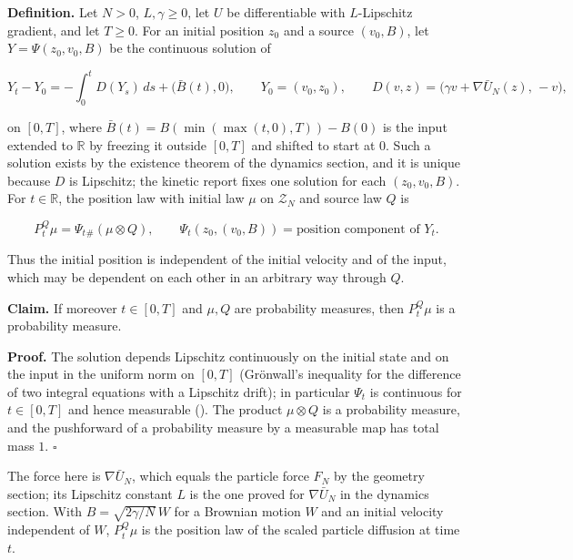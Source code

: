 \documentclass[11pt,a4paper]{article}
\begin{document}
\textbf{Definition.} Let \(N>0\), \(L,\gamma\ge0\), let \(U\) be differentiable with \(L\)-Lipschitz gradient, and let \(T\ge0\). For an initial position \(z_0\) and a source \((v_0,B)\), let \(Y=\Psi(z_0,v_0,B)\) be the continuous solution of


\[Y_t-Y_0=-\int_0^tD(Y_s)\,ds+\bigl(\bar B(t),0\bigr),\qquad Y_0=(v_0,z_0),\qquad D(v,z)=\bigl(\gamma v+\nabla\bar U_N(z),\,-v\bigr),\]


on \([0,T]\), where \(\bar B(t)=B(\min(\max(t,0),T))-B(0)\) is the input extended to \(\mathbb R\) by freezing it outside \([0,T]\) and shifted to start at \(0\). Such a solution exists by the existence theorem of the dynamics section, and it is unique because \(D\) is Lipschitz; the kinetic report fixes one solution for each \((z_0,v_0,B)\). For \(t\in\mathbb R\), the position law with initial law \(\mu\) on \(\mathcal Z_N\) and source law \(Q\) is


\[P^Q_t\mu=\Psi_t{}_\#(\mu\otimes Q),\qquad\Psi_t(z_0,(v_0,B))=\text{position component of }Y_t.\]


Thus the initial position is independent of the initial velocity and of the input, which may be dependent on each other in an arbitrary way through \(Q\).




\textbf{Claim.} If moreover \(t\in[0,T]\) and \(\mu,Q\) are probability measures, then \(P^Q_t\mu\) is a probability measure.




\textbf{Proof.} The solution depends Lipschitz continuously on the initial state and on the input in the uniform norm on \([0,T]\) (Grönwall's inequality for the difference of two integral equations with a Lipschitz drift); in particular \(\Psi_t\) is continuous for \(t\in[0,T]\) and hence measurable (\cite[Section~3.9.4]{LangevinLean2026Kinetic}). The product \(\mu\otimes Q\) is a probability measure, and the pushforward of a probability measure by a measurable map has total mass \(1\). \(\square\)




The force here is \(\nabla\bar U_N\), which equals the particle force \(F_N\) by the geometry section; its Lipschitz constant \(L\) is the one proved for \(\nabla\bar U_N\) in the dynamics section. With \(B=\sqrt{2\gamma/N}\,W\) for a Brownian motion \(W\) and an initial velocity independent of \(W\), \(P^Q_t\mu\) is the position law of the scaled particle diffusion at time \(t\).
\end{document}
